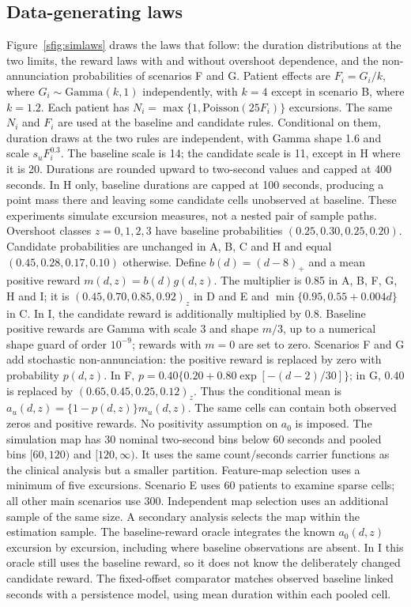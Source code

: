 \documentclass[11pt,letterpaper]{article}
\begin{document}


\subsection{Data-generating laws}
Figure~\ref{sfig:simlaws} draws the laws that follow: the duration distributions at the two limits, the reward laws with and without overshoot dependence, and the non-annunciation probabilities of scenarios F and G.
Patient effects are $F_i=G_i/k$, where $G_i\sim\mathrm{Gamma}(k,1)$ independently, with $k=4$ except in scenario B, where $k=1.2$. Each patient has $N_i=\max\{1,\mathrm{Poisson}(25F_i)\}$ excursions. The same $N_i$ and $F_i$ are used at the baseline and candidate rules. Conditional on them, duration draws at the two rules are independent, with Gamma shape 1.6 and scale $s_uF_i^{0.3}$. The baseline scale is 14; the candidate scale is 11, except in H where it is 20. Durations are rounded upward to two-second values and capped at 400 seconds. In H only, baseline durations are capped at 100 seconds, producing a point mass there and leaving some candidate cells unobserved at baseline. These experiments simulate excursion measures, not a nested pair of sample paths.
Overshoot classes $z=0,1,2,3$ have baseline probabilities $(0.25,0.30,0.25,0.20)$. Candidate probabilities are unchanged in A, B, C and H and equal $(0.45,0.28,0.17,0.10)$ otherwise. Define $b(d)=(d-8)_+$ and a mean positive reward $m(d,z)=b(d)g(d,z)$. The multiplier is 0.85 in A, B, F, G, H and I; it is $(0.45,0.70,0.85,0.92)_z$ in D and E and $\min\{0.95,0.55+0.004d\}$ in C. In I, the candidate reward is additionally multiplied by 0.8. Baseline positive rewards are Gamma with scale 3 and shape $m/3$, up to a numerical shape guard of order $10^{-9}$; rewards with $m=0$ are set to zero.
Scenarios F and G add stochastic non-annunciation: the positive reward is replaced by zero with probability $p(d,z)$. In F, $p=0.40\{0.20+0.80\exp[-(d-2)/30]\}$; in G, 0.40 is replaced by $(0.65,0.45,0.25,0.12)_z$. Thus the conditional mean is $a_u(d,z)=\{1-p(d,z)\}m_u(d,z)$. The same cells can contain both observed zeros and positive rewards. No positivity assumption on $a_0$ is imposed.
The simulation map has 30 nominal two-second bins below 60 seconds and pooled bins $[60,120)$ and $[120,\infty)$. It uses the same count/seconds carrier functions as the clinical analysis but a smaller partition. Feature-map selection uses a minimum of five excursions. Scenario E uses 60 patients to examine sparse cells; all other main scenarios use 300. Independent map selection uses an additional sample of the same size. A secondary analysis selects the map within the estimation sample. The baseline-reward oracle integrates the known $a_0(d,z)$ excursion by excursion, including where baseline observations are absent. In I this oracle still uses the baseline reward, so it does not know the deliberately changed candidate reward. The fixed-offset comparator matches observed baseline linked seconds with a persistence model, using mean duration within each pooled cell.
\end{document}
